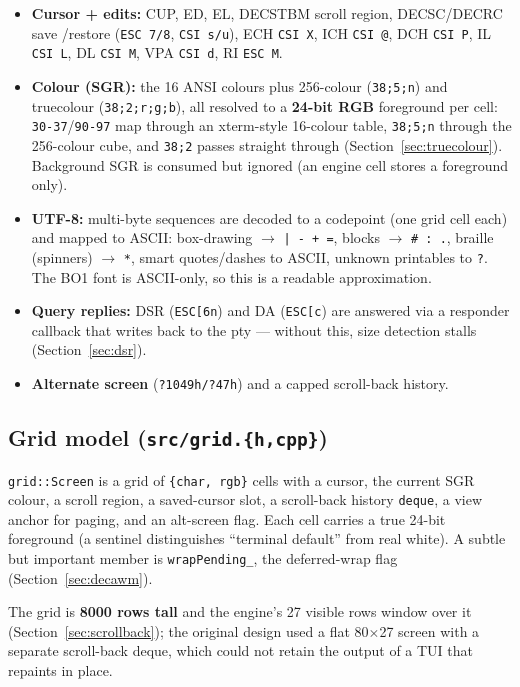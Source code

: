 \documentclass[11pt]{article}
\newcommand{\ic}[1]{\texttt{#1}}
\begin{document}
\begin{itemize}[nosep]
  \item \textbf{Cursor + edits:} CUP, ED, EL, DECSTBM scroll region, DECSC/DECRC save
  /restore (\ic{ESC 7/8}, \ic{CSI s/u}), ECH \ic{CSI X}, ICH \ic{CSI @}, DCH \ic{CSI P},
  IL \ic{CSI L}, DL \ic{CSI M}, VPA \ic{CSI d}, RI \ic{ESC M}.
  \item \textbf{Colour (SGR):} the 16 ANSI colours plus 256-colour (\ic{38;5;n}) and
  truecolour (\ic{38;2;r;g;b}), all resolved to a \textbf{24-bit RGB} foreground per
  cell: \ic{30-37}/\ic{90-97} map through an xterm-style 16-colour table,
  \ic{38;5;n} through the 256-colour cube, and \ic{38;2} passes straight through
  (Section~\ref{sec:truecolour}). Background SGR is consumed but ignored (an engine
  cell stores a foreground only).
  \item \textbf{UTF-8:} multi-byte sequences are decoded to a codepoint (one grid cell
  each) and mapped to ASCII: box-drawing $\rightarrow$ \texttt{| - + =}, blocks
  $\rightarrow$ \texttt{\# : .}, braille (spinners) $\rightarrow$ \texttt{*}, smart
  quotes/dashes to ASCII, unknown printables to \texttt{?}. The BO1 font is ASCII-only,
  so this is a readable approximation.
  \item \textbf{Query replies:} DSR (\ic{ESC[6n}) and DA (\ic{ESC[c}) are answered via a
  responder callback that writes back to the pty --- without this, size detection
  stalls (Section~\ref{sec:dsr}).
  \item \textbf{Alternate screen} (\ic{?1049h/?47h}) and a capped scroll-back history.
\end{itemize}

\subsection{Grid model (\texttt{src/grid.\{h,cpp\}})}

\ic{grid::Screen} is a grid of \ic{\{char, rgb\}} cells with a cursor, the current SGR
colour, a scroll region, a saved-cursor slot, a scroll-back history \ic{deque}, a view
anchor for paging, and an alt-screen flag. Each cell carries a true 24-bit foreground
(a sentinel distinguishes ``terminal default'' from real white). A subtle but important
member is \ic{wrapPending_}, the deferred-wrap flag (Section~\ref{sec:decawm}).

The grid is \textbf{8000 rows tall} and the engine's 27 visible rows window over it
(Section~\ref{sec:scrollback}); the original design used a flat 80$\times$27 screen with
a separate scroll-back deque, which could not retain the output of a TUI that repaints
in place.
\end{document}
